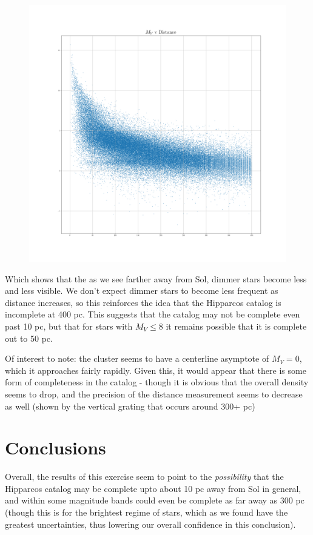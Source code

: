 \documentclass{business-covered} %
\begin{document}
		\begin{figure}[h!]
			\includegraphics[scale=.33]{figures/dist_mag.png}
		\end{figure}
\pagebreak
		Which shows that the as we see farther away from Sol, dimmer stars become less and less visible. We don't expect dimmer stars to become less frequent as distance increases, so this reinforces the idea that the Hipparcos catalog is incomplete at 400 pc. This suggests that the catalog may not be complete even past 10 pc, but that for stars with $M_V\le 8$ it remains possible that it is complete out to 50 pc.
		
		Of interest to note: the cluster seems to have a centerline asymptote of $M_V=0$, which it approaches fairly rapidly. Given this, it would appear that there is some form of completeness in the catalog - though it is obvious that the overall density seems to drop, and the precision of the distance measurement seems to decrease as well (shown by the vertical grating that occurs around 300+ pc) 
		
		
\pagebreak
	\section{Conclusions}
		
		Overall, the results of this exercise seem to point to the \textit{possibility} that the Hipparcos catalog may be complete upto about 10 pc away from Sol in general, and within some magnitude bands could even be complete as far away as 300 pc (though this is for the brightest regime of stars, which as we found have the greatest uncertainties, thus lowering our overall confidence in this conclusion).
		
\end{document}
